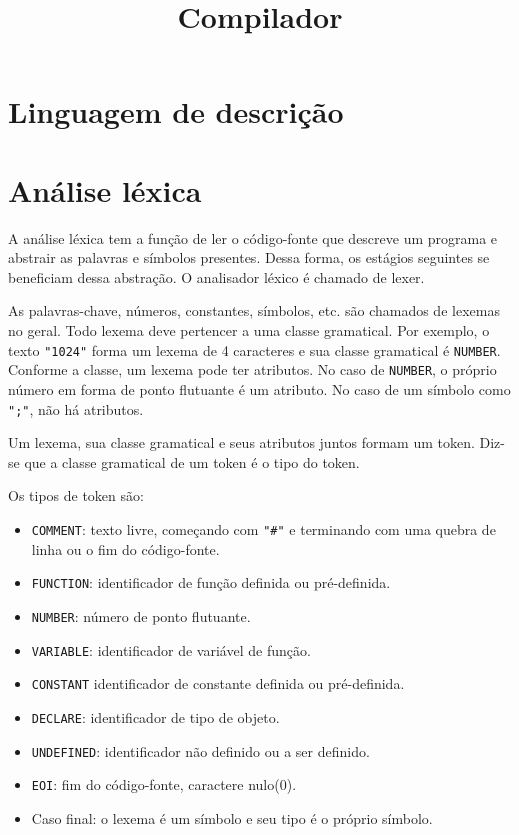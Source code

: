 \documentclass[10pt,a4paper]{article}
\title{Compilador}
\date{}
\author{}
\begin{document}
\maketitle

\newpage
\section{Linguagem de descrição}

\newpage
\section{Análise léxica}
A análise léxica tem a função de ler o código-fonte que descreve um programa e abstrair as palavras e símbolos presentes.
Dessa forma, os estágios seguintes se beneficiam dessa abstração. O analisador léxico é chamado de lexer.

As palavras-chave, números, constantes, símbolos, etc. são chamados de lexemas no geral.
Todo lexema deve pertencer a uma classe gramatical.
Por exemplo, o texto \texttt{"1024"} forma um lexema de 4 caracteres e sua classe gramatical é \texttt{NUMBER}.
Conforme a classe, um lexema pode ter atributos.
No caso de \texttt{NUMBER}, o próprio número em forma de ponto flutuante é um atributo.
No caso de um símbolo como \texttt{";"}, não há atributos.

Um lexema, sua classe gramatical e seus atributos juntos formam um token.
Diz-se que a classe gramatical de um token é o tipo do token.

Os tipos de token são:
\begin{itemize}
\item \texttt{COMMENT}: texto livre, começando com \texttt{"\#"} e
terminando com uma quebra de linha ou o fim do código-fonte.
\item \texttt{FUNCTION}: identificador de função definida ou pré-definida.
\item \texttt{NUMBER}: número de ponto flutuante.
\item \texttt{VARIABLE}: identificador de variável de função.
\item \texttt{CONSTANT} identificador de constante definida ou pré-definida.
\item \texttt{DECLARE}: identificador de tipo de objeto.
\item \texttt{UNDEFINED}: identificador não definido ou a ser definido.
\item \texttt{EOI}: fim do código-fonte, caractere nulo(0).
\item Caso final: o lexema é um símbolo e seu tipo é o próprio símbolo.

\end{itemize}
\end{document}
